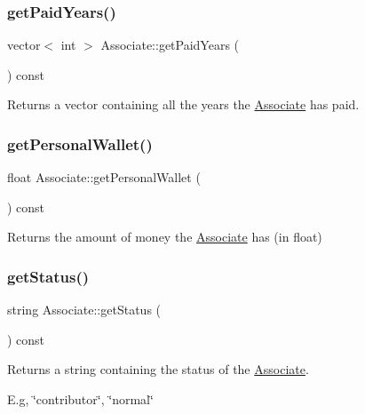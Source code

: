 \subsubsection{\texorpdfstring{get\+Paid\+Years()}{getPaidYears()}}
{\footnotesize\ttfamily vector$<$ int $>$ Associate\+::get\+Paid\+Years (\begin{DoxyParamCaption}{ }\end{DoxyParamCaption}) const}



Returns a vector containing all the years the \mbox{\hyperlink{classAssociate}{Associate}} has paid. 

\mbox{\label{classAssociate_a75ad2c5af6c2a21fb1828f785751f390}} 
\subsubsection{\texorpdfstring{get\+Personal\+Wallet()}{getPersonalWallet()}}
{\footnotesize\ttfamily float Associate\+::get\+Personal\+Wallet (\begin{DoxyParamCaption}{ }\end{DoxyParamCaption}) const}



Returns the amount of money the \mbox{\hyperlink{classAssociate}{Associate}} has (in float) 

\mbox{\label{classAssociate_a9f6109b8164cf8193f9fabd5ff2871f7}} 
\subsubsection{\texorpdfstring{get\+Status()}{getStatus()}}
{\footnotesize\ttfamily string Associate\+::get\+Status (\begin{DoxyParamCaption}{ }\end{DoxyParamCaption}) const}



Returns a string containing the status of the \mbox{\hyperlink{classAssociate}{Associate}}. 

E.\+g, \char`\"{}contributor\char`\"{}, \char`\"{}normal\char`\"{} \mbox{\label{classAssociate_aaca11bf6dea5df3710931898e00a0944}} 
